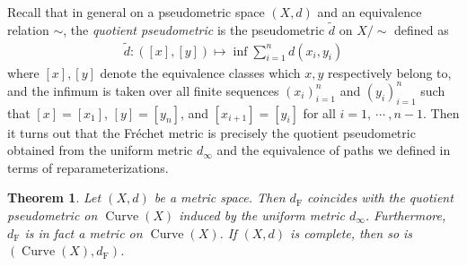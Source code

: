 \documentclass[reqno,centertags,12pt]{amsart}
\newtheorem{theorem}{Theorem}[section]
\theoremstyle{definition}
\numberwithin{equation}{section}
\newcommand{\seq}[1]{\left( #1 \right)}
\begin{document}
Recall that in general on a pseudometric space $(X,d)$ and an equivalence relation $\sim$,
the \emph{quotient pseudometric} is the pseudometric $\tilde{d}$ on $X/\sim$ defined as
\begin{align*}
	\tilde{d}\colon ([x],[y]) \mapsto \inf\sum_{i=1}^{n}d(x_{i},y_{i})
\end{align*}
where $[x],[y]$ denote the equivalence classes which $x,y$ respectively belong to,
and the infimum is taken over all finite sequences
$\seq{x_{i}}_{i=1}^{n}$ and $\seq{y_{i}}_{i=1}^{n}$ such that
$[x] = [x_{1}]$, $[y] = [y_{n}]$, and $[x_{i+1}] = [y_{i}]$ for
all $i=1,\ \cdots\ ,n-1$. Then it turns out that the Fr\'{e}chet metric is precisely
the quotient pseudometric obtained from the uniform metric $d_{\infty}$
and the equivalence of paths we defined in terms of reparameterizations.

\begin{theorem}\label{TA.11}
	Let $(X,d)$ be a metric space. Then $d_{\mathrm{F}}$ coincides with the
	quotient pseudometric on $\operatorname{Curve}(X)$ induced by the uniform metric
	$d_{\infty}$. Furthermore, $d_{\mathrm{F}}$ is in fact a metric on
	$\operatorname{Curve}(X)$. If $(X,d)$ is complete, then so is
	$(\operatorname{Curve}(X),d_{\mathrm{F}})$.
\end{theorem}
\end{document}
